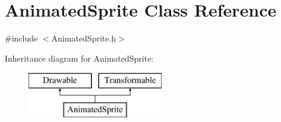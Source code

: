 \hypertarget{class_animated_sprite}{}\section{Animated\+Sprite Class Reference}
\label{class_animated_sprite}


{\ttfamily \#include $<$Animated\+Sprite.\+h$>$}

Inheritance diagram for Animated\+Sprite\+:\begin{figure}[H]
\begin{center}
\leavevmode
\includegraphics[height=2.000000cm]{class_animated_sprite}
\end{center}
\end{figure}
